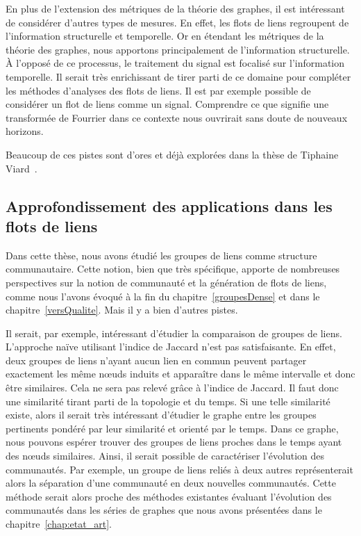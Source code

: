 En plus de l'extension des métriques de la théorie  des graphes, il est intéressant de considérer d'autres types de mesures.
En effet, les flots de liens regroupent de l'information structurelle et temporelle.
Or en étendant les métriques de la théorie des graphes, nous apportons principalement de l'information structurelle.
\`A l'opposé de ce processus, le traitement du signal est focalisé sur l'information temporelle.
Il serait très enrichissant de tirer parti de ce domaine pour compléter les méthodes d'analyses des flots de liens.
Il est par exemple possible de considérer un flot de liens comme un signal.
Comprendre ce que signifie une transformée de Fourrier dans ce contexte nous ouvrirait sans doute de nouveaux horizons.

Beaucoup de ces pistes sont d'ores et déjà explorées dans la thèse de Tiphaine Viard~\cite{viard2016flots}.

\subsection{Approfondissement des applications dans les flots de liens}
Dans cette thèse, nous avons étudié les groupes de liens comme structure communautaire.
Cette notion, bien que très spécifique, apporte de nombreuses perspectives sur la notion de communauté et la génération de flots de liens, comme nous l'avons évoqué à la fin du chapitre~\ref{groupesDense} et dans le chapitre~\ref{versQualite}.
Mais il y a bien d'autres pistes.

Il serait, par exemple, intéressant d'étudier la comparaison de groupes de liens.
L'approche naïve utilisant l'indice de Jaccard n'est pas satisfaisante.
En effet, deux groupes de liens n'ayant aucun lien en commun peuvent partager exactement les même n\oe{}uds induits et apparaître dans le même intervalle et donc être similaires.
Cela ne sera pas relevé grâce à l'indice de Jaccard.
Il faut donc une similarité tirant parti de la topologie et du temps.
Si une telle similarité existe, alors il serait très intéressant d'étudier le graphe entre les groupes pertinents pondéré par leur similarité et orienté par le temps.
Dans ce graphe, nous pouvons espérer trouver des groupes de liens proches dans le temps ayant des n\oe{}uds similaires.
Ainsi, il serait possible de caractériser l'évolution des communautés.
Par exemple, un groupe de liens reliés à deux autres représenterait alors la séparation d'une communauté en deux nouvelles communautés.
Cette méthode serait alors proche des méthodes existantes évaluant l'évolution des communautés dans les séries de graphes que nous avons présentées dans le chapitre~\ref{chap:etat_art}.


